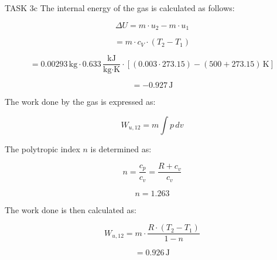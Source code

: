 TASK 3c  
The internal energy of the gas is calculated as follows:

\[
\Delta U = m \cdot u_2 - m \cdot u_1
\]

\[
= m \cdot c_V \cdot (T_2 - T_1)
\]

\[
= 0.00293 \, \text{kg} \cdot 0.633 \, \frac{\text{kJ}}{\text{kg·K}} \cdot \left[ (0.003 \cdot 273.15) - (500 + 273.15) \, \text{K} \right]
\]

\[
= -0.927 \, \text{J}
\]

The work done by the gas is expressed as:

\[
W_{u,12} = m \int p \, dv
\]

The polytropic index \( n \) is determined as:

\[
n = \frac{c_p}{c_v} = \frac{R + c_v}{c_v}
\]

\[
n = 1.263
\]

The work done is then calculated as:

\[
W_{u,12} = m \cdot \frac{R \cdot (T_2 - T_1)}{1 - n}
\]

\[
= 0.926 \, \text{J}
\]